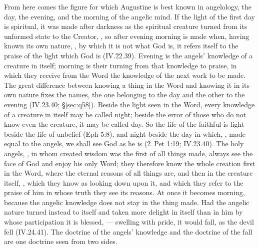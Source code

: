 From here comes the figure for which Augustine is best known in
angelology, the day, the evening, and the morning of the angelic mind. If
the light of the first day is spiritual, it was made after darkness as
the spiritual creature turned from its unformed state to the Creator,
, so after evening morning is made
when, having known its own nature, , by which it is not what God is, it
refers itself to the praise of the light which God is (IV.22.39). Evening
is the angels' knowledge of a creature in itself; morning is their turning
from that knowledge to praise, in which they receive from the Word the
knowledge of the next work to be made. The great difference between
knowing a thing in the Word and knowing it in its own nature fixes the
names, the one belonging to the day and the other to the evening
(IV.23.40; \S\ref{sec:q58}). Beside the light seen in the Word, every knowledge of a creature in
itself may be called night; beside the error of those who do not know
even the creature, it may be called day. So the life of the faithful is
light beside the life of unbelief (Eph 5:8), and night beside the day in
which, , made equal to the angels, we shall
see God as he is (2~Pet 1:19; IV.23.40). The holy angels, , in whom created wisdom was the
first of all things made, always see the face of God and enjoy his only
Word; they therefore know the whole creation first in the Word, where the eternal
reasons of all things are, and then in the creature itself, , which they know as looking down
upon it, and which they refer to the praise of him in whose truth they see
its reasons. At once it becomes morning, because the angelic knowledge
does not stay in the thing made. Had the angelic nature turned instead to
itself and taken more delight in itself than in him by whose participation
it is blessed,  ---
swelling with pride, it would fall, as the devil fell (IV.24.41). The
doctrine of the angels' knowledge and the doctrine of the fall are one
doctrine seen from two sides.

